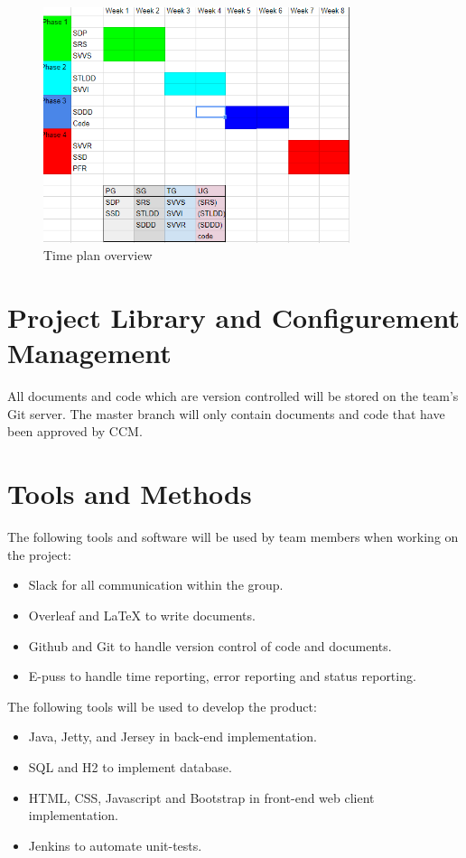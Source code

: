 \documentclass{article}
\begin{document}
\begin{figure}[h]
\centering\includegraphics[width=0.8\textwidth]{calendar.PNG}
\caption{\label{Calendar} Time plan overview}
\end{figure}

\section{Project Library and Configurement Management}
All documents and code which are version controlled will be stored on the team's Git server. The master branch will only contain documents and code that have been approved by CCM. 

\section{Tools and Methods}

The following tools and software will be used by team members when working on the project:

\begin{itemize}
    \item Slack for all communication within the group.
    \item Overleaf and LaTeX to write documents.
    \item Github and Git to handle version control of code and documents.
    \item E-puss to handle time reporting, error reporting and status reporting.
\end{itemize}

The following tools will be used to develop the product:
\begin{itemize}
    \item Java, Jetty, and Jersey in back-end implementation.
    \item SQL and H2 to implement database.
    \item HTML, CSS, Javascript and Bootstrap in front-end web client implementation.
    \item Jenkins to automate unit-tests. 
\end{itemize}
\end{document}
